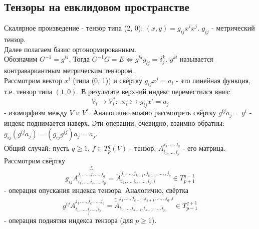 \subsection{Тензоры на евклидовом пространстве}
Скалярное произведение - тензор типа (2, 0): $(x, y) = g_{ij}x^ix^j$. $g_{ij}$ - метрический тензор.\\
Далее полагаем базис ортонормированным.\\
Обозначим $G^{-1} = g^{kl}$. Тогда $G^{-1}G = E \Leftrightarrow g^{kl}g_{lj} = \delta_j^k$. $g^{kl}$ называется контравариантным метрическим тензором.\\
Рассмотрим вектор $x^i$ (типа (0, 1)) и свёртку $g_{ij}x^j = a_i$ - это линейная функция, т.е. тензор типа $(1, 0)$. В результате верхний индекс переместился вниз:
\[V_i \longrightarrow V_i^*: \ \ x_i \rightarrowtail g_{ij}x^i = a_j\]
- изоморфизм между $V$ и $V^*$. Аналогично можно рассмотреть свёртку $g^{ij}a_j = y^i$ - индекс поднимается наверх. Эти операции, очевидно, взаимно обратны: $g_{ij}(g^{ij}a_j) = (g_{ij}g^{ij})a_j = a_j$.\\
Общий случай: пусть $q \geqslant 1$, $f\in T_p^q(V)$ - тензор, $A_{i_1,...,i_p}^{j_1,...,j_q}$ - его матрица. Рассмотрим свёртку
\[g_{ij}A_{i_1,...,i_s,...,i_p}^{j_1,...,\overbrace{j}^{k},...,j_q} = \tilde{A}_{i_1,...,i_s,,...,i_p, i}^{j_1,...,j_{k-1},j_{k+1},...,,j_q} \in T_{p+1}^{q-1}\]
- операция опускания индекса тензора. Аналогично, свёртка
\[g^{ij}A_{i_1,...,\underbrace{i}_{s},...,i_p}^{j_1,...,j_k,...,j_q} = \tilde{\tilde{{A}}}_{i_1,...,i_{s-1},i_{s+1},...,i_p}^{j_1,...,j_{k-1},j_{k+1},...,,j_q, j} \in T_{p-1}^{q+1}\]
- операция поднятия индекса тензора (для $p \geqslant 1$). 